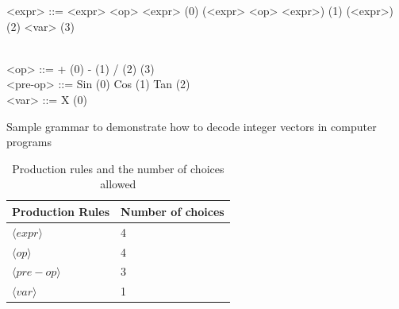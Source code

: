 \documentclass[conference]{IEEEtran}
\begin{document}
%	
%	
%	
%	


\begin{Grammar}
	\begin{grammar}
		
		
		<expr> ::=  <expr> <op> <expr> \hspace{2cm} (0) 
		\alt (<expr> <op> <expr>)  \hspace{1.75cm}  (1)  
		\alt <pre-op> (<expr>) \hspace{2.2cm}  (2)  \hspace{3.9cm} (3) \\\
		
		<op> ::=  + \hspace{4.4cm} (0)   \alt - \hspace{4.5cm}  (1)  \alt  /  \hspace{4.51cm}  (2) \alt * \hspace{4.45cm}  (3) \\
		
		<pre-op> ::= Sin \hspace{4.2cm} (0) \alt Cos
	\hspace{4.12cm} (1) \alt Tan  \hspace{4.13cm} (2) \\
		
		<var> ::= X  \hspace{4.4cm} (0)
		
		
	\end{grammar}
	
	\caption{Sample grammar to demonstrate how to decode integer vectors in computer programs}
	\label{gram:gramatica}
\end{Grammar}


\begin{table}[htb]
	\centering
	\caption{Production rules and the number of choices allowed}
	\label{tab:productionRules}
	\begin{tabular}{|l|l|}
		\hline
		Production Rules & Number of choices \\ \hline
		$\langle expr \rangle$                        & 4       \\ \hline
		$\langle op \rangle$                         & 4       \\ \hline
		$\langle pre-op \rangle$                         & 3       \\ \hline
		$\langle var \rangle$                          & 1       \\ \hline
	\end{tabular}
\end{table}
\end{document}
